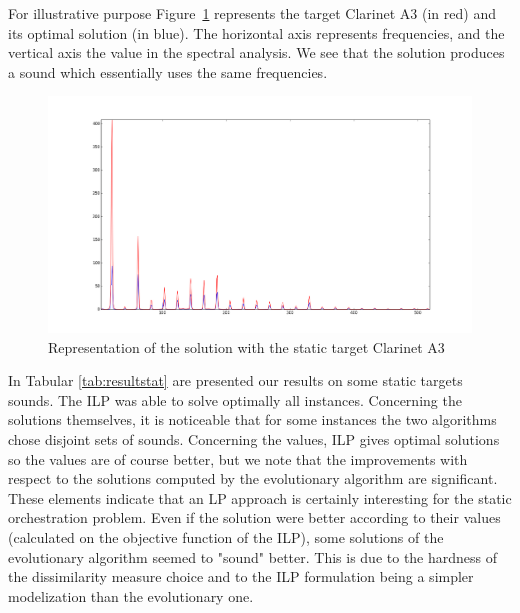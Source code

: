 \documentclass[a4paper]{book}
\begin{document}
For illustrative purpose Figure~\ref{fig:claA3} represents the target Clarinet A3 (in red) and its optimal solution (in blue). The horizontal axis represents frequencies, and the vertical axis the value in the spectral analysis. We see that the solution produces a sound which essentially uses the same frequencies. 

\begin{figure}[ht!]
    \centering
    \includegraphics[scale=0.3]{clarinetA3.png}
    \caption{Representation of the solution with the static target Clarinet A3 }
    \label{fig:claA3}
\end{figure}

In Tabular \ref{tab:resultstat} are presented our results on some static targets sounds. The ILP was able to solve optimally all instances. Concerning the solutions themselves, it is noticeable that for some instances the two algorithms chose disjoint sets of sounds. Concerning the values, ILP gives optimal solutions so the values are of course better, but we note that the improvements with respect to the solutions computed by the evolutionary algorithm are significant. These elements indicate that an LP approach is certainly interesting for the static orchestration problem. Even if the solution were better according to their values (calculated on the objective function of the ILP), some solutions of the evolutionary algorithm seemed to "sound" better. This is due to the hardness of the dissimilarity measure choice and to the ILP formulation being a simpler modelization than the evolutionary one. 
 
\end{document}
